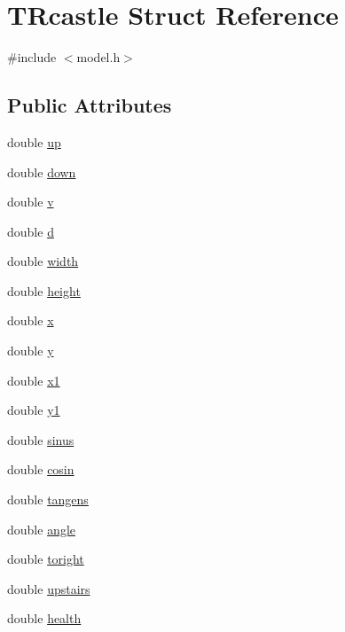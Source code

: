 \hypertarget{struct_t_rcastle}{}\section{T\+Rcastle Struct Reference}
\label{struct_t_rcastle}


{\ttfamily \#include $<$model.\+h$>$}

\subsection*{Public Attributes}
\begin{DoxyCompactItemize}
\item 
double \hyperlink{struct_t_rcastle_a8795b22682121b2d98aa10ecbcc5c950}{up}
\item 
double \hyperlink{struct_t_rcastle_a6256c708f2b3e4114c0ebab3f388aede}{down}
\item 
double \hyperlink{struct_t_rcastle_a35cd1c80d382fcf153c8ce5a55676642}{v}
\item 
double \hyperlink{struct_t_rcastle_adaf3bf8d36b2d4115959858737f4d277}{d}
\item 
double \hyperlink{struct_t_rcastle_a070133588b3ceb37881590fc42f6a3d1}{width}
\item 
double \hyperlink{struct_t_rcastle_a8233f9c16ee4b0e9c53dc5da5ab0ade3}{height}
\item 
double \hyperlink{struct_t_rcastle_abda3f6ca289399c054e4c5eda9651122}{x}
\item 
double \hyperlink{struct_t_rcastle_a04e7abedc910e08ebf0fecac129d96c7}{y}
\item 
double \hyperlink{struct_t_rcastle_a2284c30dfba99adf368dfa5a2f3b7bed}{x1}
\item 
double \hyperlink{struct_t_rcastle_a560becdf5bd4c0ce143f3490ebefc341}{y1}
\item 
double \hyperlink{struct_t_rcastle_ad2ee1171abe396daebffa0cf94f523fb}{sinus}
\item 
double \hyperlink{struct_t_rcastle_ad7002df0e24f1d7d6c36240ea4aac2a2}{cosin}
\item 
double \hyperlink{struct_t_rcastle_a56ecb2585e6581b242f29f3594df7273}{tangens}
\item 
double \hyperlink{struct_t_rcastle_a2fd7be705bdd092f15e434666d793329}{angle}
\item 
double \hyperlink{struct_t_rcastle_a67bda138dc3c05550da282dcabd223ba}{toright}
\item 
double \hyperlink{struct_t_rcastle_a4dd235ff59de5a9a4c3d9632a87ad9bf}{upstairs}
\item 
double \hyperlink{struct_t_rcastle_a8fc2c90a8127bac5ea539f14d6da4850}{health}
\end{DoxyCompactItemize}



